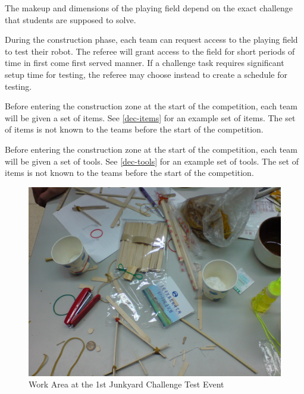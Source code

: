 \documentclass[12pt]{hurocup}
\begin{document}
\label{lc-field}

\begin{lawlist}[JC]

\item The makeup and dimensions of the playing field depend on the
  exact challenge that students are supposed to solve.

\item During the construction phase, each team can request access to
  the playing field to test their robot. The referee will grant access
  to the field for short periods of time in first come first served
  manner. If a challenge task requires significant setup time for
  testing, the referee may choose instead to create a schedule for
  testing.

\end{lawlist}

\label{law-iteams-and-tools}

\begin{lawlist}[JC]

\item \label{l-items} Before entering the construction zone at the
  start of the competition, each team will be given a set of
  items. See \ref{dec-items} for an example set of items. The set of
  items is not known to the teams before the start of the competition.

\item \label{l-tools} Before entering the construction zone at the
  start of the competition, each team will be given a set of
  tools. See \ref{dec-tools} for an example set of tools. The set of
  items is not known to the teams before the start of the competition.

\end{lawlist}

\begin{figure}
\begin{center}
\includegraphics[width=0.8\linewidth]{Figures/junkyard_challenge_table}
\caption{Work Area at the 1st Junkyard Challenge Test Event}
\label{fig:work-area}
\end{center}
\end{figure}
\end{document}

